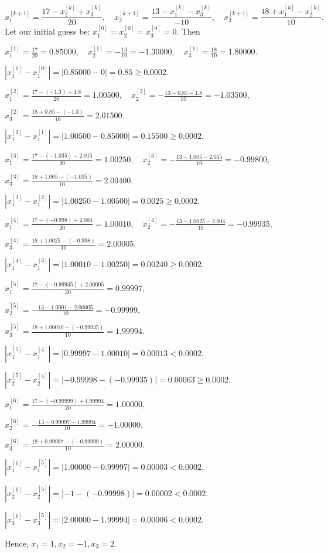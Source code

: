 \begin{solution}[8.0cm]
\[
 x_1^{[k+1]}=\frac{17-x_2^{[k]}+x_3^{[k]}}{20},
 \quad
 x_2^{[k+1]}=\frac{13-x_1^{[k]}-x_3^{[k]}}{-10},
 \quad
 x_3^{[k+1]}=\frac{18+x_1^{[k]}-x_2^{[k]}}{10}.
\]
Let our initial guess be: $x_1^{[0]}=x_2^{[0]}=x_3^{[0]}=0$. Then

\smallskip
\(\displaystyle
x_1^{[1]}=\frac{17}{20}=0.85000, \quad x_2^{[1]}=-\frac{13}{10}=-1.30000, \quad x_3^{[1]}=\frac{18}{10}=1.80000.
\)

\smallskip
\(
|x_1^{[1]} - x_1^{[0]}| = |0.85000-0| = 0.85 \geq 0.0002.
\)

\bigskip
\(\displaystyle
x_1^{[2]}=\frac{17-(-1.3)+1.8}{20}=1.00500, \quad x_2^{[2]}=-\frac{13-0.85-1.8}{10}=-1.03500,\)

\smallskip
\(\displaystyle x_3^{[2]}=\frac{18+0.85-(-1.3)}{10}=2.01500.
\)

\smallskip\(
|x_1^{[2]} - x_1^{[1]}| = |1.00500-0.85000| = 0.15500 \geq 0.0002.
\)

\bigskip
\(\displaystyle
x_1^{[3]}=\frac{17-(-1.035)+2.015}{20}=1.00250, \quad x_2^{[3]}=-\frac{13-1.005-2.015}{10}=-0.99800,\)

\smallskip
\(\displaystyle x_3^{[3]}=\frac{18+1.005-(-1.035)}{10}=2.00400.
\)

\smallskip\(
|x_1^{[3]} - x_1^{[2]}| = |1.00250-1.00500| = 0.0025 \geq 0.0002.
\)

\bigskip
\(\displaystyle
x_1^{[4]}=\frac{17-(-0.998)+2.004}{20}=1.00010, \quad x_2^{[4]}=-\frac{13-1.0025-2.004}{10}=-0.99935,\)

\smallskip
\(\displaystyle x_3^{[4]}=\frac{18+1.0025-(-0.998)}{10}=2.00005.
\)

\smallskip\(
|x_1^{[4]} - x_1^{[3]}| = |1.00010-1.00250| = 0.00240 \geq 0.0002.
\)

\bigskip
\(\displaystyle
x_1^{[5]}=\frac{17-(-0.99935)+2.00005}{20}=0.99997, \)

\smallskip
\(\displaystyle x_2^{[5]}=-\frac{13-1.0001-2.00005}{10}=-0.99999,\)

\smallskip
\(\displaystyle x_3^{[5]}=\frac{18+1.00010-(-0.99935)}{10}=1.99994.
\)

\smallskip\(
|x_1^{[5]} - x_1^{[4]}| = |0.99997-1.00010| = 0.00013 < 0.0002.
\)

\smallskip\(
|x_2^{[5]} - x_2^{[4]}| = |-0.99998-(-0.99935)| = 0.00063 \geq 0.0002.
\)

\bigskip
\(\displaystyle
x_1^{[6]}=\frac{17-(-0.99999)+1.99994}{20}=1.00000, \)

\smallskip
\(\displaystyle x_2^{[6]}=-\frac{13-0.99997-1.99994}{10}=-1.00000,\)

\smallskip
\(\displaystyle x_3^{[6]}=\frac{18+0.99997-(-0.99999)}{10}=2.00000.
\)

\smallskip\(
|x_1^{[6]} - x_1^{[5]}| = |1.00000-0.99997| = 0.00003 < 0.0002.
\)

\smallskip\(
|x_2^{[6]} - x_2^{[5]}| = |-1-(-0.99998)| = 0.00002 < 0.0002.
\)

\smallskip\(
|x_3^{[6]} - x_3^{[5]}| = |2.00000-1.99994| = 0.00006 < 0.0002.
\)

\medskip
\noindent
Hence, $x_1 = 1, x_2 = -1, x_3 =2$.
\end{solution}

